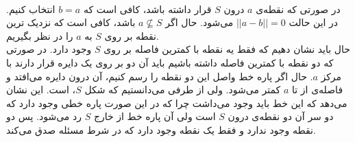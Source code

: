 \\
در صورتی که نقطه‌ی
$a$ درون $S$
قرار داشته باشد، کافی است که
$b = a$
انتخاب کنیم. در این حالت
$||a-b|| = 0$
می‌شود.
حال اگر
$a \not\subseteq S$
باشد، کافی است که نزدیک ترین نقطه بر روی
$S$ به $a$
را در نظر بگیریم.
\\\noindent
حال باید نشان دهیم که فقط یه نقطه با کمترین فاصله بر روی
$S$
وجود دارد. در صورتی که دو نقطه با کمترین فاصله داشته باشیم باید آن دو بر روی یک دایره قرار دارند
با مرکز
$a$.
حال اگر پاره خط واصل این دو نقطه را رسم کنیم، آن درون دایره می‌افتد و فاصله‌ی از تا
$a$
کمتر می‌شود.
ولی از طرفی می‌دانستیم که شکل
$S$، 
است. این نشان می‌دهد که این خط باید وجود می‌داشت چرا که در این صورت پاره خطی وجود دارد که دو سر آن دو
نقطه‌ی درون
$S$
است ولی آن پاره خط از خارج
$S$ رد می‌شود.
پس دو نقطه وجود ندارد و فقط یک نقطه وجود دارد که در شرط مسئله صدق می‌کند.